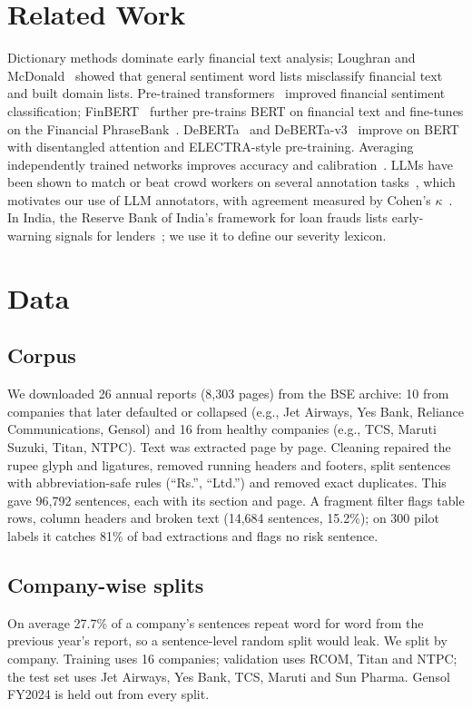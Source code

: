 \documentclass[conference]{IEEEtran}
\begin{document}
\section{Related Work}
Dictionary methods dominate early financial text analysis; Loughran and McDonald~\cite{loughran2011} showed that general sentiment word lists misclassify financial text and built domain lists. Pre-trained transformers~\cite{devlin2019bert} improved financial sentiment classification; FinBERT~\cite{araci2019finbert} further pre-trains BERT on financial text and fine-tunes on the Financial PhraseBank~\cite{malo2014}. DeBERTa~\cite{he2021deberta} and DeBERTa-v3~\cite{he2023debertav3} improve on BERT with disentangled attention and ELECTRA-style pre-training. Averaging independently trained networks improves accuracy and calibration~\cite{lakshminarayanan2017}. LLMs have been shown to match or beat crowd workers on several annotation tasks~\cite{gilardi2023}, which motivates our use of LLM annotators, with agreement measured by Cohen's $\kappa$~\cite{cohen1960}. In India, the Reserve Bank of India's framework for loan frauds lists early-warning signals for lenders~\cite{rbi2015ews}; we use it to define our severity lexicon.

\section{Data}
\subsection{Corpus}
We downloaded 26 annual reports (8,303 pages) from the BSE archive: 10 from companies that later defaulted or collapsed (e.g., Jet Airways, Yes Bank, Reliance Communications, Gensol) and 16 from healthy companies (e.g., TCS, Maruti Suzuki, Titan, NTPC). Text was extracted page by page. Cleaning repaired the rupee glyph and ligatures, removed running headers and footers, split sentences with abbreviation-safe rules (``Rs.'', ``Ltd.'') and removed exact duplicates. This gave 96,792 sentences, each with its section and page. A fragment filter flags table rows, column headers and broken text (14,684 sentences, 15.2\%); on 300 pilot labels it catches 81\% of bad extractions and flags no risk sentence.

\subsection{Company-wise splits}
On average 27.7\% of a company's sentences repeat word for word from the previous year's report, so a sentence-level random split would leak. We split by company. Training uses 16 companies; validation uses RCOM, Titan and NTPC; the test set uses Jet Airways, Yes Bank, TCS, Maruti and Sun Pharma. Gensol FY2024 is held out from every split.
\end{document}
